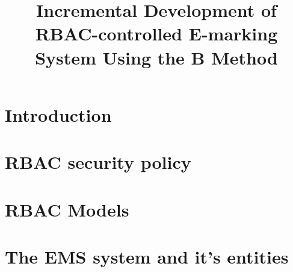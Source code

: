 \documentclass[conference]{IEEEtran}
\begin{document}
\title{Incremental Development of RBAC-controlled E-marking System Using the B Method}

{\author{%
}

\maketitle

\begin{abstract}



\end{abstract}




 
\maketitle

\section{Introduction}








\section{RBAC security policy}\label{sec:background}



\section{RBAC Models}\label{sec:models}




\section{The EMS system and it's entities}\label{sec:entities}

}
\end{document}
